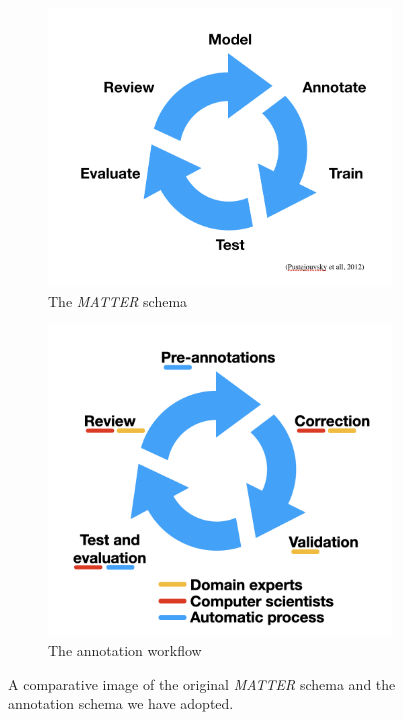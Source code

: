 \documentclass[a4paper,10pt]{article}
\begin{document}
\begin{figure}[h!]
\centering
\begin{subfigure}{.5\textwidth}
  \centering
  \includegraphics[width=\linewidth]{matter-schema}
  \caption{The \textit{MATTER} schema}
  \label{fig:sub1}
\end{subfigure}%
\begin{subfigure}{.5\textwidth}
  \centering
  \includegraphics[width=\linewidth]{matter-grobid-schema}
  \caption{The annotation workflow}
  \label{fig:sub2}
\end{subfigure}
\caption{A comparative image of the original \textit{MATTER} schema and the annotation schema we have adopted. }
\label{fig:schema-comparison}
\end{figure}
\end{document}
